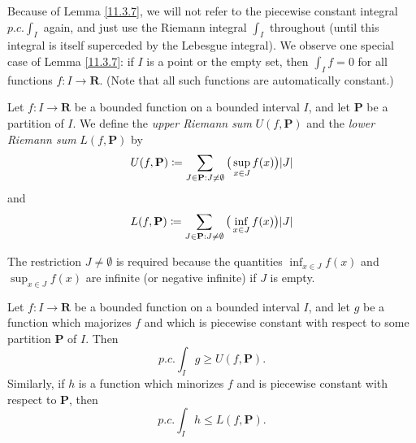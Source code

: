 \begin{remark}\label{11.3.8}
    Because of Lemma \ref{11.3.7}, we will not refer to the piecewise constant integral \(p.c. \int_I\) again, and just use the Riemann integral \(\int_I\) throughout
    (until this integral is itself superceded by the Lebesgue integral).
    We observe one special case of Lemma \ref{11.3.7}:
    if \(I\) is a point or the empty set, then \(\int_I f = 0\) for all functions \(f : I \to \mathbf{R}\).
    (Note that all such functions are automatically constant.)
\end{remark}

\begin{definition}\label{11.3.9}
    Let \(f : I \to \mathbf{R}\) be a bounded function on a bounded interval \(I\), and let \(\mathbf{P}\) be a partition of \(I\).
    We define the \emph{upper Riemann sum} \(U(f, \mathbf{P})\) and the \emph{lower Riemann sum} \(L(f, \mathbf{P})\) by
    \[
        U(f, \mathbf{P}) \coloneqq \sum_{J \in \mathbf{P} : J \neq \emptyset} \big(\sup_{x \in J} f(x)\big) \abs*{J}
    \]
    and
    \[
        L(f, \mathbf{P}) \coloneqq \sum_{J \in \mathbf{P} : J \neq \emptyset} \big(\inf_{x \in J} f(x)\big) \abs*{J}
    \]
\end{definition}

\begin{remark}\label{11.3.10}
    The restriction \(J \neq \emptyset\) is required because the quantities \(\inf_{x \in J} f(x)\) and \(\sup_{x \in J} f(x)\) are infinite (or negative infinite) if \(J\) is empty.
\end{remark}

\begin{lemma}\label{11.3.11}
    Let \(f : I \to \mathbf{R}\) be a bounded function on a bounded interval \(I\), and let \(g\) be a function which majorizes \(f\) and which is piecewise constant with respect to some partition \(\mathbf{P}\) of \(I\).
    Then
    \[
        p.c. \int_I g \geq U(f, \mathbf{P}).
    \]
    Similarly, if \(h\) is a function which minorizes \(f\) and is piecewise constant with respect to \(\mathbf{P}\), then
    \[
        p.c. \int_I h \leq L(f, \mathbf{P}).
    \]
\end{lemma}

